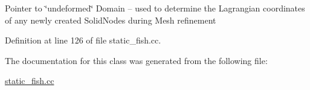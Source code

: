 Pointer to \char`\"{}undeformed\char`\"{} Domain -- used to determine the Lagrangian coordinates of any newly created Solid\+Nodes during Mesh refinement 

Definition at line 126 of file static\+\_\+fish.\+cc.



The documentation for this class was generated from the following file\+:\begin{DoxyCompactItemize}
\item 
\hyperlink{static__fish_8cc}{static\+\_\+fish.\+cc}\end{DoxyCompactItemize}
